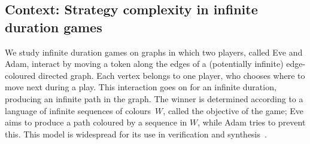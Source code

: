 \subsection*{Context: Strategy complexity in infinite duration games}

We study infinite duration games on graphs in which two players, called Eve and Adam, interact by  moving a token along the edges of a (potentially infinite) edge-coloured directed graph. Each vertex belongs to one player, who chooses where to move next during a play. This interaction goes on for an infinite duration, producing an infinite path in the graph. The winner is determined according to a language of infinite sequences of colours~$W$, called the objective of the game; Eve aims to produce a path coloured by a sequence in $W$, while Adam tries to prevent this.
This model is widespread for its use in verification and synthesis~\cite{HandbookModelChecking2018}.



